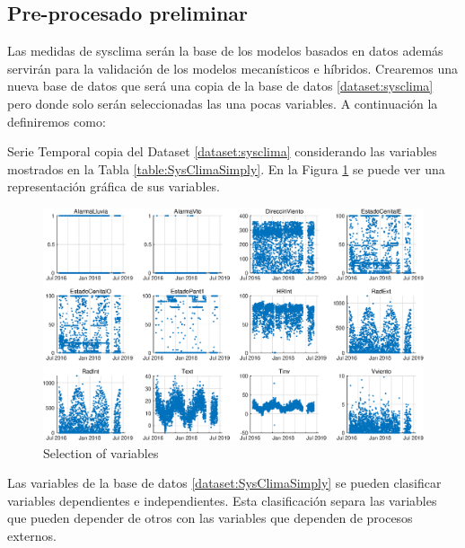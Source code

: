 \subsection{Pre-procesado preliminar}

Las medidas de sysclima serán la base de los modelos basados en datos además servirán para la validación de los modelos mecanísticos e híbridos. Crearemos una nueva base de datos que será una copia de la base de datos \ref{dataset:sysclima} pero donde solo serán seleccionadas las una pocas variables. A continuación la definiremos como:

\begin{dataset}\label{dataset:SysClimaSimply}
    Serie Temporal copia del Dataset \ref{dataset:sysclima} considerando las variables mostrados en la Tabla \ref{table:SysClimaSimply}. En la Figura  \ref{fig:ViewDataSetSysClimaCompact} se puede ver una representación gráfica de sus variables.
\end{dataset}



\begin{figure}
    \centering 
    \includegraphics[scale=0.55]{img/SysClimaDataSet02.eps}
    \caption{Selection of variables}
    \label{fig:ViewDataSetSysClimaCompact}
\end{figure}

 
Las variables de la base de datos \ref{dataset:SysClimaSimply} se pueden clasificar variables dependientes e independientes. Esta clasificación separa las variables que pueden depender de otros con las variables que dependen de procesos externos. 

